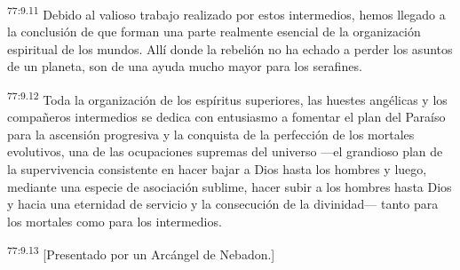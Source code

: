 \par
\textsuperscript{77:9.11} Debido al valioso trabajo realizado por estos intermedios, hemos llegado a la conclusión de que forman una parte realmente esencial de la organización espiritual de los mundos. Allí donde la rebelión no ha echado a perder los asuntos de un planeta, son de una ayuda mucho mayor para los serafines.

\par
\textsuperscript{77:9.12} Toda la organización de los espíritus superiores, las huestes angélicas y los compañeros intermedios se dedica con entusiasmo a fomentar el plan del Paraíso para la ascensión progresiva y la conquista de la perfección de los mortales evolutivos, una de las ocupaciones supremas del universo ---el grandioso plan de la supervivencia consistente en hacer bajar a Dios hasta los hombres y luego, mediante una especie de asociación sublime, hacer subir a los hombres hasta Dios y hacia una eternidad de servicio y la consecución de la divinidad--- tanto para los mortales como para los intermedios.

\par
\textsuperscript{77:9.13} [Presentado por un Arcángel de Nebadon.]